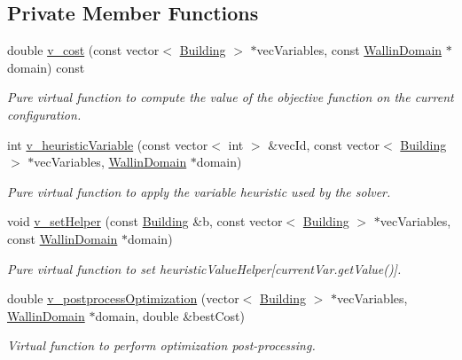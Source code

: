 \subsection*{Private Member Functions}
\begin{DoxyCompactItemize}
\item 
double \hyperlink{classghost_1_1NoneObj_a73a9b27b282120a3b0469253efc2e639}{v\-\_\-cost} (const vector$<$ \hyperlink{classghost_1_1Building}{Building} $>$ $\ast$vec\-Variables, const \hyperlink{classghost_1_1WallinDomain}{Wallin\-Domain} $\ast$domain) const 
\begin{DoxyCompactList}\small\item\em Pure virtual function to compute the value of the objective function on the current configuration. \end{DoxyCompactList}\item 
int \hyperlink{classghost_1_1NoneObj_aa09ad00592be7ce8380d423cd05de28e}{v\-\_\-heuristic\-Variable} (const vector$<$ int $>$ \&vec\-Id, const vector$<$ \hyperlink{classghost_1_1Building}{Building} $>$ $\ast$vec\-Variables, \hyperlink{classghost_1_1WallinDomain}{Wallin\-Domain} $\ast$domain)
\begin{DoxyCompactList}\small\item\em Pure virtual function to apply the variable heuristic used by the solver. \end{DoxyCompactList}\item 
void \hyperlink{classghost_1_1NoneObj_a12cfdb56540821d557b932b22e7a2091}{v\-\_\-set\-Helper} (const \hyperlink{classghost_1_1Building}{Building} \&b, const vector$<$ \hyperlink{classghost_1_1Building}{Building} $>$ $\ast$vec\-Variables, const \hyperlink{classghost_1_1WallinDomain}{Wallin\-Domain} $\ast$domain)
\begin{DoxyCompactList}\small\item\em Pure virtual function to set heuristic\-Value\-Helper\mbox{[}current\-Var.\-get\-Value()\mbox{]}. \end{DoxyCompactList}\item 
double \hyperlink{classghost_1_1NoneObj_aafc43cad67f5ccd5e3c913a576896669}{v\-\_\-postprocess\-Optimization} (vector$<$ \hyperlink{classghost_1_1Building}{Building} $>$ $\ast$vec\-Variables, \hyperlink{classghost_1_1WallinDomain}{Wallin\-Domain} $\ast$domain, double \&best\-Cost)
\begin{DoxyCompactList}\small\item\em Virtual function to perform optimization post-\/processing. \end{DoxyCompactList}\end{DoxyCompactItemize}
